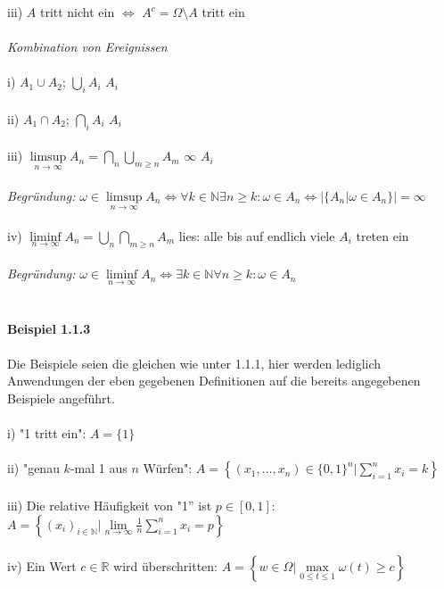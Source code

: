 \documentclass[10pt,a4paper]{report}
\numberwithin{equation}{section}
\numberwithin{figure}{section}
\theoremstyle{plain}
\theoremstyle{definition}
\theoremstyle{plain}
\theoremstyle{definition}
\theoremstyle{remark}
\theoremstyle{plain}
\begin{document}
iii) $A$ tritt nicht ein $\Leftrightarrow$ $A^c=\Omega\setminus A$ tritt ein \\\\
\textit{Kombination von Ereignissen}\\\\
i) $A_1 \cup A_2$; $\bigcup\limits_i A_i$\qquad {} $A_i$ \\\\
ii) $A_1 \cap A_2$; $\bigcap\limits_i A_i$\qquad {} $A_i$ \\\\
iii) $\limsup\limits_{n \to \infty} A_n=\bigcap\limits_{n}\bigcup\limits_{m\geq n}A_m$\qquad {} $\infty$ $A_i$  \\\\
\textit{Begründung:} $\omega \in \limsup\limits_{n \to \infty} A_n \Leftrightarrow \forall k \in \mathbb{N} \exists n\geq k: \omega \in A_n \Leftrightarrow |\{A_n|\omega \in A_n\}|=\infty$\\\\
iv) $\liminf\limits_{n \to \infty} A_n=\bigcup\limits_{n}\bigcap\limits_{m\geq n}A_m$ \qquad lies: alle bis auf endlich viele $A_i$ treten ein\\\\
\textit{Begründung:} $\omega \in \liminf\limits_{n \to \infty} A_n \Leftrightarrow \exists k \in \mathbb{N} \forall n\geq k: \omega \in A_n$\\\\\\
\textbf{Beispiel 1.1.3}\\\\
Die Beispiele seien die gleichen wie unter 1.1.1, hier werden lediglich Anwendungen der eben gegebenen Definitionen auf die bereits angegebenen Beispiele angeführt.\\\\
i) "1 tritt ein": $A=\{1\}$ \\\\
ii) "genau $k$-mal 1 aus $n$ Würfen": $A=\left\{(x_1,\dots,x_n) \in \{0,1\}^n| \sum\limits_{i=1}^nx_i=k\right\}$\\\\
iii) Die relative Häufigkeit von "1'' ist $p \in [0,1]$: $A=\left\{(x_i)_{i \in \mathbb{N}}|\lim\limits_{n \to \infty}\frac{1}{n}\sum\limits_{i=1}^n x_i=p\right\}$\\\\
iv) Ein Wert $c \in \mathbb{R}$ wird überschritten: $A=\left\{w \in \Omega| \max\limits_{0\leq t\leq 1}\omega(t)\geq c \right\}$  \\\\\\
\end{document}
